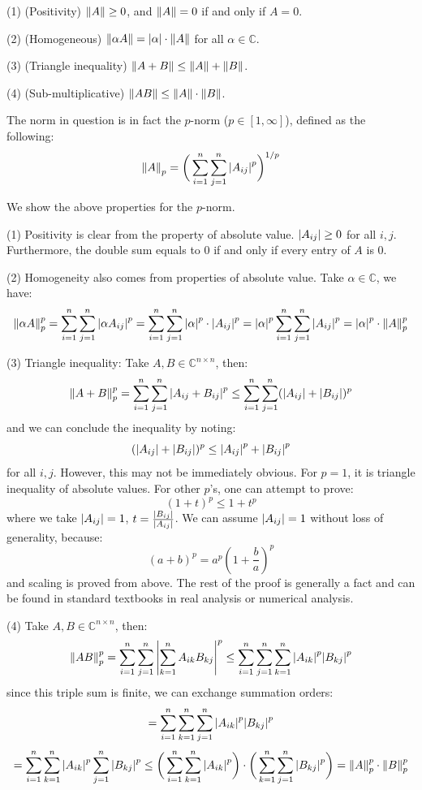 \documentclass[12pt]{article} %
\newcommand{\cc}{\mathbb{C}}
\newcommand{\1}[1]{\mathds{1}\left[#1\right]}
\begin{document}
(1) (Positivity) $\norm{A} \ge 0$, and $\norm{A} = 0$ if and only if $A=0$.

(2) (Homogeneous) $\norm{\alpha A} = \abs{\alpha}\cdot\norm{A}$ for all $\alpha\in \cc$.

(3) (Triangle inequality) $\norm{A+B} \le \norm{A} + \norm{B}$.

(4) (Sub-multiplicative) $\norm{AB} \le \norm{A}\cdot\norm{B}$.

The norm in question is in fact the $p$-norm ($p\in [1,\infty]$), defined as the following:
$$
	\norm{A}_p = \bigg(\sum_{i=1}^{n}\sum_{j=1}^{n}\abs{A_{ij}}^p\bigg)^{1/p}
$$

We show the above properties for the $p$-norm.

(1) Positivity is clear from the property of absolute value. $\abs{A_{ij}}\ge 0$ for all $i,j$. Furthermore, the double sum equals to 0 if and only if every entry of $A$ is 0.

(2) Homogeneity also comes from properties of absolute value. Take $\alpha\in \cc$, we have:
$$
	\norm{\alpha A}_p^p = \sum_{i=1}^n\sum_{j=1}^n\abs{\alpha A_{ij}}^p = \sum_{i=1}^n\sum_{j=1}^n\abs{\alpha}^p\cdot\abs{A_{ij}}^p = \abs{\alpha}^p\sum_{i=1}^n\sum_{j=1}^n\abs{A_{ij}}^p = \abs{\alpha}^p\cdot\norm{A}_p^{p}
$$

(3) Triangle inequality: Take $A,B\in\cc^{n\times n}$, then:
$$
	\norm{A+B}_p^p = \sum_{i=1}^n\sum_{j=1}^n\abs{A_{ij} + B_{ij}}^p \le \sum_{i=1}^n\sum_{j=1}^n (\abs{A_{ij}} + \abs{B_{ij}})^p
$$ and we can conclude the inequality by noting:
$$
	(\abs{A_{ij}} + \abs{B_{ij}})^p \le \abs{A_{ij}}^p + \abs{B_{ij}}^p
$$ for all $i,j$. However, this may not be immediately obvious. For $p=1$, it is triangle inequality of absolute values. For other $p$'s, one can attempt to prove:
$$
	(1+t)^p \le 1+t^p
$$ where we take $\abs{A_{ij}} = 1$, $t=\frac{\abs{B_{ij}}}{\abs{A_{ij}}}$. We can assume $\abs{A_{ij}} = 1$ without loss of generality, because:
$$
	(a+b)^p = {a^p}(1+\frac{b}{a})^p
$$ and scaling is proved from above. The rest of the proof is generally a fact and can be found in standard textbooks in real analysis or numerical analysis.

(4) Take $A,B\in\cc^{n\times n}$, then:
$$
	\norm{AB}_p^p = \sum_{i=1}^n\sum_{j=1}^n\abs{\sum_{k=1}^nA_{ik}B_{kj}}^p \le \sum_{i=1}^n\sum_{j=1}^n\sum_{k=1}^n \abs{A_{ik}}^p\abs{B_{kj}}^p
$$ since this triple sum is finite, we can exchange summation orders:
$$
	= \sum_{i=1}^n\sum_{k=1}^n\sum_{j=1}^n \abs{A_{ik}}^p\abs{B_{kj}}^p 
	$$
	$$= \sum_{i=1}^n\sum_{k=1}^n\abs{A_{ik}}^p \sum_{j=1}^n\abs{B_{kj}}^p \le \bigg(
	\sum_{i=1}^n\sum_{k=1}^n\abs{A_{ik}}^p
	\bigg)\cdot
	\bigg(
	\sum_{k=1}^n\sum_{j=1}^n\abs{B_{kj}}^p
	\bigg) = \norm{A}_p^p\cdot\norm{B}_p^p
$$
\end{document}
